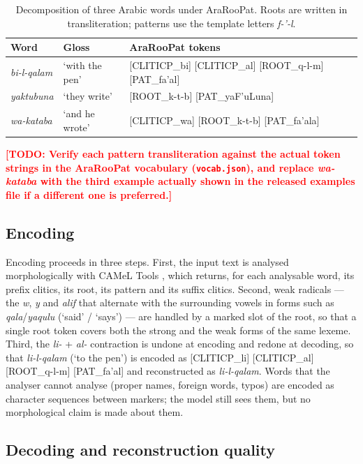\documentclass[a4paper,fleqn]{cas-sc}
\newcommand{\todo}[1]{\textcolor{red}{\textbf{[\textsc{TODO}: #1]}}}
\begin{document}
\begin{table}[t]
\centering
\caption{Decomposition of three Arabic words under AraRooPat. Roots are written in transliteration; patterns use the template letters \emph{f-'-l}.}
\label{tab:decomposition}
\begin{tabular}{@{}lll@{}}
\toprule
Word & Gloss & AraRooPat tokens \\
\midrule
\emph{bi-l-qalam} & `with the pen' & [CLITICP\_bi] [CLITICP\_al] [ROOT\_q-l-m] [PAT\_fa'al] \\
\emph{yaktubuna} & `they write' & [ROOT\_k-t-b] [PAT\_yaF'uLuna] \\
\emph{wa-kataba} & `and he wrote' & [CLITICP\_wa] [ROOT\_k-t-b] [PAT\_fa'ala] \\
\bottomrule
\end{tabular}
\vspace{2pt}
\raggedright\footnotesize
\todo{Verify each pattern transliteration against the actual token strings in the AraRooPat vocabulary (\texttt{vocab.json}), and replace \emph{wa-kataba} with the third example actually shown in the released examples file if a different one is preferred.}
\end{table}

\subsection{Encoding}
\label{sec:tokenizer:encoding}

Encoding proceeds in three steps. First, the input text is analysed morphologically with CAMeL Tools \citep{obeid2020camel}, which returns, for each analysable word, its prefix clitics, its root, its pattern and its suffix clitics. Second, weak radicals --- the \emph{w}, \emph{y} and \emph{alif} that alternate with the surrounding vowels in forms such as \emph{qala}/\emph{yaqulu} (`said' / `says') --- are handled by a marked slot of the root, so that a single root token covers both the strong and the weak forms of the same lexeme. Third, the \emph{li-} + \emph{al-} contraction is undone at encoding and redone at decoding, so that \emph{li-l-qalam} (`to the pen') is encoded as [CLITICP\_li] [CLITICP\_al] [ROOT\_q-l-m] [PAT\_fa'al] and reconstructed as \emph{li-l-qalam}. Words that the analyser cannot analyse (proper names, foreign words, typos) are encoded as character sequences between markers; the model still sees them, but no morphological claim is made about them.

\subsection{Decoding and reconstruction quality}
\label{sec:tokenizer:decoding}
\end{document}

